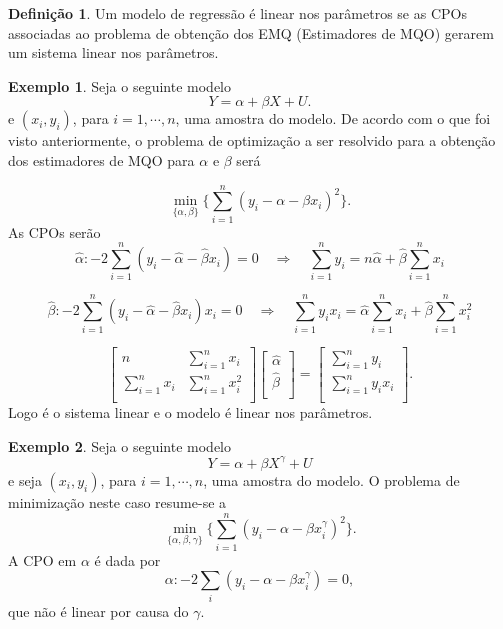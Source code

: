 \documentclass[
]{book}
\theoremstyle{definition}
\newtheorem{definition}{Definição}[chapter]
\theoremstyle{definition}
\newtheorem{example}{Exemplo}[chapter]
\theoremstyle{definition}
\theoremstyle{remark}
\begin{document}
\begin{definition}
\protect\hypertarget{def:defslp}{}{\label{def:defslp} }Um modelo de regressão é linear nos parâmetros se as CPOs
associadas ao problema de obtenção dos EMQ (Estimadores de MQO)
gerarem um sistema linear nos parâmetros.
\end{definition}

\begin{example}
\protect\hypertarget{exm:exmslp}{}{\label{exm:exmslp} }Seja o seguinte modelo \[Y=\alpha+\beta X+U.\] e \((x_i,y_i)\), para \(i=1,\cdots,n\), uma amostra do modelo. De acordo com o que foi visto anteriormente, o problema de optimização a ser resolvido para a obtenção dos estimadores de MQO para \(\alpha\) e \(\beta\) será

\[\underset{\{\alpha,\beta\}}{\min}\bigg\{\sum_{i=1}^n(y_i-\alpha-\beta x_i)^2\bigg\}.\]
As CPOs serão
\[\widehat{\alpha}:-2\sum_{i=1}^n(y_i-\widehat{\alpha}-\widehat{\beta}x_i)=0 \quad \Longrightarrow\quad \sum_{i=1}^n y_i=n\widehat{\alpha}+\widehat{\beta}\sum_{i=1}^nx_i\]

\[\widehat{\beta}:-2\sum_{i=1}^n(y_i-\widehat{\alpha}-\widehat{\beta}x_i)x_i=0 \quad \Longrightarrow\quad \sum_{i=1}^ny_ix_i=\widehat{\alpha}\sum_{i=1}^nx_i+\widehat{\beta}\sum_{i=1}^nx_i^2\]

\[\left[%
\begin{array}{cc}
  n & \sum_{i=1}^nx_i \\
  \sum_{i=1}^nx_i & \sum_{i=1}^nx_i^2 \\
\end{array}%
\right]\left[%
\begin{array}{c}
  \widehat{\alpha} \\
  \widehat{\beta} \\
\end{array}%
\right]=\left[%
\begin{array}{c}
  \sum_{i=1}^ny_i \\
  \sum_{i=1}^ny_ix_i \\
\end{array}%
\right].\]
Logo é o sistema linear e o modelo é linear nos parâmetros.
\end{example}

\begin{example}
\protect\hypertarget{exm:exmslp2}{}{\label{exm:exmslp2} }Seja o seguinte modelo \[Y=\alpha+\beta X^{\gamma}+U \] e seja \((x_i,y_i)\), para \(i=1,\cdots,n\), uma amostra do modelo. O problema de minimização neste caso resume-se a
\[\underset{\{\alpha,\beta,\gamma\}}{\min}\bigg\{\sum_{i=1}^n(y_i-\alpha-\beta x_i^{\gamma})^2\bigg\}.\]
A CPO em \(\alpha\) é dada por
\[\alpha:-2\sum_i(y_i-\alpha-\beta x_i^{\gamma})=0,\]
que não é linear por causa do \(\gamma\).
\end{example}
\end{document}
